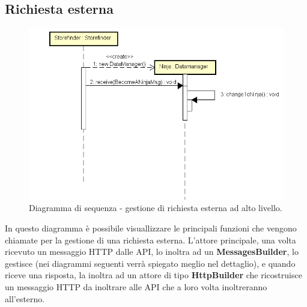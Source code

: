 \documentclass[a4paper]{article}
\begin{document}
        \subsection{Richiesta esterna}
            \begin{figure} [H]
				\centering
				\includegraphics[width=\textwidth]{ST/seq/CreazioneNinja.png}
				\caption{Diagramma di sequenza - gestione di richiesta esterna ad alto livello.}
			\end{figure}
            In questo diagramma è possibile visuallizzare le principali funzioni che vengono chiamate per la gestione di una richiesta esterna. L'attore principale, una volta ricevuto un 
            messaggio HTTP dalle API, lo inoltra ad un \textbf{MessagesBuilder}, lo gestisce (nei diagrammi seguenti verrà spiegato meglio nel dettaglio), e quando riceve una risposta, la 
            inoltra ad un attore di tipo \textbf{HttpBuilder} che ricostruisce un messaggio HTTP da inoltrare alle API che a loro volta inoltreranno all'esterno.
            
\end{document}
